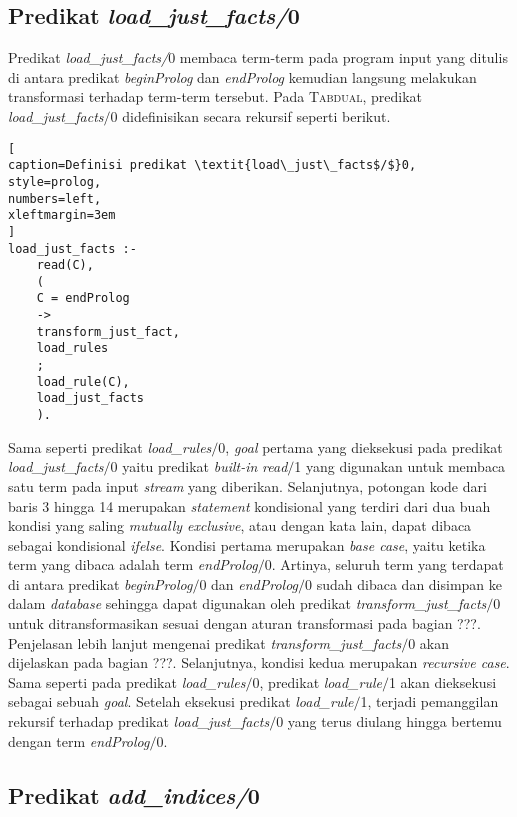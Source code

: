 \subsection{Predikat \textit{load\_just\_facts/}0}

Predikat \textit{load\_just\_facts/}0 membaca term-term pada program input yang ditulis di antara predikat \textit{beginProlog} dan \textit{endProlog} kemudian langsung melakukan transformasi terhadap term-term tersebut. Pada \textsc{Tabdual}, predikat \textit{load\_just\_facts$/$}0 didefinisikan secara rekursif seperti berikut.
\\

\begin{lstlisting}[
caption=Definisi predikat \textit{load\_just\_facts$/$}0,
style=prolog,
numbers=left,
xleftmargin=3em
]
load_just_facts :-
	read(C),
	(
	C = endProlog
	->
	transform_just_fact,
	load_rules
	;
	load_rule(C),
	load_just_facts
	).
\end{lstlisting}

Sama seperti predikat \textit{load\_rules$/$}0, \textit{goal} pertama yang dieksekusi pada predikat \textit{load\_just\_facts$/$}0  yaitu predikat \textit{built-in} \textit{read$/$}1 yang digunakan untuk membaca satu term pada input \textit{stream} yang diberikan. Selanjutnya, potongan kode dari baris 3 hingga 14 merupakan \textit{statement} kondisional yang terdiri dari dua buah kondisi yang saling \textit{mutually exclusive}, atau dengan kata lain, dapat dibaca sebagai kondisional \textit{if\textendash else}. Kondisi pertama merupakan \textit{base case}, yaitu ketika term yang dibaca adalah term \textit{endProlog$/$}0. Artinya, seluruh term yang terdapat di antara predikat \textit{beginProlog$/$}0 dan \textit{endProlog$/$}0 sudah dibaca dan disimpan ke dalam \textit{database} sehingga dapat digunakan oleh predikat \textit{transform\_just\_facts$/$}0 untuk ditransformasikan sesuai dengan aturan transformasi pada bagian ???. Penjelasan lebih lanjut mengenai predikat \textit{transform\_just\_facts$/$}0 akan dijelaskan pada bagian ???. Selanjutnya, kondisi kedua merupakan \textit{recursive case}. Sama seperti pada predikat \textit{load\_rules$/$}0, predikat \textit{load\_rule$/$}1 akan dieksekusi sebagai sebuah \textit{goal}. Setelah eksekusi predikat \textit{load\_rule$/$}1, terjadi pemanggilan rekursif terhadap predikat \textit{load\_just\_facts$/$}0 yang terus diulang hingga bertemu dengan term \textit{endProlog$/$}0.

\subsection{Predikat \textit{add\_indices/}0}
\label{subsec:add_indices}

